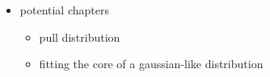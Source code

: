 \begin{itemize}
    \color{red}
    \item potential chapters
    \begin{itemize}
        \item pull distribution
        \item fitting the core of a gaussian-like distribution
    \end{itemize}
\end{itemize}
